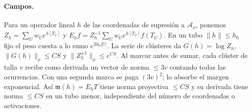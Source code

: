 \paragraph{Campos.}
Para un operador lineal $h$ de las coordenadas de supresión a $\mathcal A_\rho$, ponemos
$Z_h=\sum_U w_U e^{h[T_U]}$ y $E_h f=Z_h^{-1}\sum_U w_U e^{h[T_U]} f(T_U)$.
En un tubo $\|h\|\le h_0$ fijo el peso cuesta a lo sumo $e^{3h_0|U|}$.
La serie de clústeres da $G(h)=\log Z_h$, $\|G(h)\|_\rho\le CS$ y
$\|Z_h^{\pm1}\|_\rho\le e^{CS}$. Al marcar antes de sumar, cada clúster de talla $v$
recibe como derivada un vector de norma $\le3v$ contando todas las ocurrencias.
Con una segunda marca se paga $(3v)^2$; lo absorbe el margen exponencial.
Así $\mathfrak m(h)=E_hT$ tiene norma proyectiva $\le CS$ y su derivada tiene norma
$\le CS$ en un tubo menor, independiente del número de coordenadas o activaciones.
